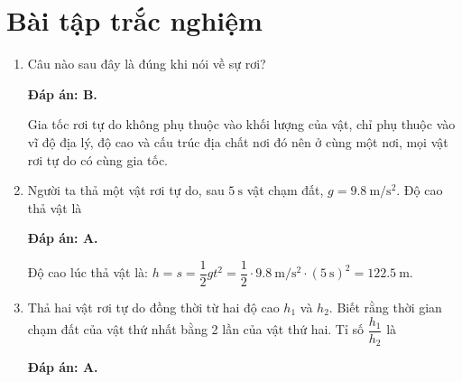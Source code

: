 \let\lesson\undefined
\newcommand{\lesson}{\phantomlesson{Bài 8.}}
\setcounter{section}{2}
\section{Bài tập trắc nghiệm}

\begin{enumerate}[label=\bfseries Câu \arabic*:]
	\item {}
	
	
	{Câu nào sau đây là đúng khi nói về sự rơi?
	}
	
	\hideall
	{	\textbf{Đáp án: B.}
		
		Gia tốc rơi tự do không phụ thuộc vào khối lượng của vật, chỉ phụ thuộc vào vĩ độ địa lý, độ cao và cấu trúc địa chất nơi đó nên ở cùng một nơi, mọi vật rơi tự do có cùng gia tốc.
	}
	
	\item {}
	
	
	{Người ta thả một vật rơi tự do, sau $\SI{5}{\second}$ vật chạm đất, $g=\SI{9.8}{\meter/\second^2}$. Độ cao thả vật là
	}
	\hideall
	{	\textbf{Đáp án: A.}	
		
		Độ cao lúc thả vật là:
		$h=s=\dfrac{1}{2}gt^2=\dfrac{1}{2}\cdot\SI{9.8}{\meter/\second^2}\cdot(\SI{5}{\second})^2=\SI{122.5}{\meter}.$
	}
	
	\item {}
	
	
	{Thả hai vật rơi tự do đồng thời từ hai độ cao $h_1$ và $h_2$. Biết rằng thời gian chạm đất của vật thứ nhất bằng 2 lần của vật thứ hai. Tỉ số $\dfrac{h_1}{h_2}$ là
	}
	\hideall
	{	\textbf{Đáp án: A.}
		
}
\end{enumerate}
